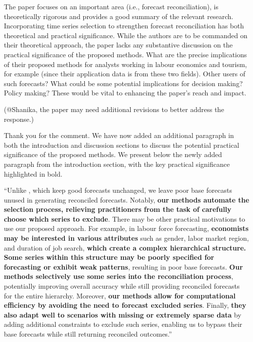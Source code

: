 \documentclass[11pt,a4paper,]{article}
\renewenvironment{quote}
               {\list{}{\rightmargin\leftmargin}%
                \item\relax\color[RGB]{0,150,0}}
               {\endlist}
\begin{document}
The paper focuses on an important area (i.e., forecast reconciliation),
is theoretically rigorous and provides a good summary of the relevant
research. Incorporating time series selection to strengthen forecast
reconciliation has both theoretical and practical significance. While
the authors are to be commanded on their theoretical approach, the paper
lacks any substantive discussion on the practical significance of the
proposed methods. What are the precise implications of their proposed
methods for analysts working in labour economics and tourism, for
example (since their application data is from these two fields). Other
users of such forecasts? What could be some potential implications for
decision making? Policy making? These would be vital to enhancing the
paper's reach and impact.

\begin{quote}
(@Shanika, the paper may need additional revisions to better address the
response.)

Thank you for the comment. We have now added an additional paragraph in
both the introduction and discussion sections to discuss the potential
practical significance of the proposed methods. We present below the
newly added paragraph from the introduction section, with the key
practical significance highlighted in bold.

``Unlike \textcite{Zhang2023-op}, which keep good forecasts unchanged,
we leave poor base forecasts unused in generating reconciled forecasts.
Notably, \textbf{our methods automate the selection process, relieving
practitioners from the task of carefully choose which series to
exclude}. There may be other practical motivations to use our proposed
approach. For example, in labour force forecasting, \textbf{economists
may be interested in various attributes} such as gender, labor market
region, and duration of job search, \textbf{which create a complex
hierarchical structure.} \textbf{Some series within this structure may
be poorly specified for forecasting or exhibit weak patterns}, resulting
in poor base forecasts. \textbf{Our methods selectively use some series
into the reconciliation process}, potentially improving overall accuracy
while still providing reconciled forecasts for the entire hierarchy.
Moreover, \textbf{our methods allow for computational efficiency by
avoiding the need to forecast excluded series}. Finally, \textbf{they
also adapt well to scenarios with missing or extremely sparse data} by
adding additional constraints to exclude such series, enabling us to
bypass their base forecasts while still returning reconciled outcomes.''
\end{quote}
\end{document}
